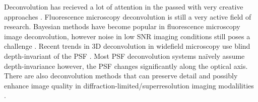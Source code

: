 \begin{definition}
	Deconvolution has recieved a lot of attention in the passed with very creative approaches \citep{Mukamel2012,Verveer2007,Periasamy1999,Swedlow2007,Rooi2014}.
	Fluorescence microscopy deconvolution is still a very active field of research.
	Bayesian methods have become popular in fluorescence microscopy image deconvolution, however noise in low SNR imaging conditions still poses a challenge \citep{Wong2015}.
	Recent trends in 3D deconvolution in widefield microscopy use blind depth-invariant of the PSF \citep{Kim2015}.
	Most PSF deconvolution systems na{\"i}vely assume depth-invariance however, the PSF changes significantly along the optical axis.
	There are also deconvolution methods that can preserve detail and possibly enhance image quality in diffraction-limited/superresolution imaging modalilities \citep{Qin2016}.
\end{definition}

